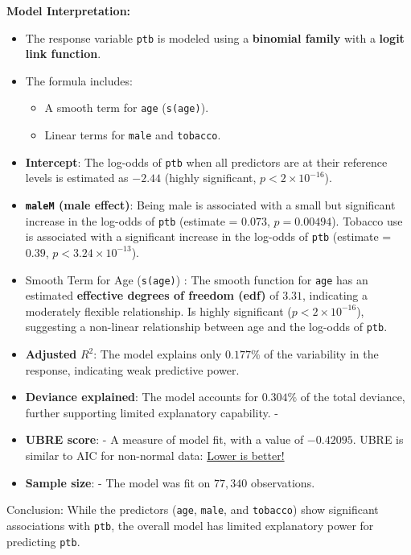 \documentclass[
  letterpaper,
  DIV=11,
  numbers=noendperiod]{scrreprt}
\providecommand{\tightlist}{%
  \setlength{\itemsep}{0pt}\setlength{\parskip}{0pt}}\usepackage{longtable,booktabs,array}
\begin{document}
\textbf{Model Interpretation:}

\begin{itemize}
\item
  The response variable \texttt{ptb} is modeled using a \textbf{binomial
  family} with a \textbf{logit link function}.
\item
  The formula includes:

  \begin{itemize}
  \tightlist
  \item
    A smooth term for \texttt{age} (\texttt{s(age)}).
  \item
    Linear terms for \texttt{male} and \texttt{tobacco}.
  \end{itemize}
\item
  \textbf{Intercept}: The log-odds of \texttt{ptb} when all predictors
  are at their reference levels is estimated as \(-2.44\) (highly
  significant, \(p < 2 \times 10^{-16}\)).
\item
  \textbf{\texttt{maleM} (male effect)}: Being male is associated with a
  small but significant increase in the log-odds of \texttt{ptb}
  (estimate = \(0.073\), \(p = 0.00494\)). Tobacco use is associated
  with a significant increase in the log-odds of \texttt{ptb} (estimate
  = \(0.39\), \(p < 3.24 \times 10^{-13}\)).
\item
  Smooth Term for Age (\texttt{s(age)}) : The smooth function for
  \texttt{age} has an estimated \textbf{effective degrees of freedom
  (edf)} of \(3.31\), indicating a moderately flexible relationship. Is
  highly significant (\(p < 2 \times 10^{-16}\)), suggesting a
  non-linear relationship between age and the log-odds of \texttt{ptb}.
\item
  \textbf{Adjusted} \(R^2\): The model explains only \(0.177\%\) of the
  variability in the response, indicating weak predictive power.
\item
  \textbf{Deviance explained}: The model accounts for \(0.304\%\) of the
  total deviance, further supporting limited explanatory capability. -
\item
  \textbf{UBRE score}: - A measure of model fit, with a value of
  \(-0.42095\). UBRE is similar to AIC for non-normal data: \ul{Lower is
  better!}
\item
  \textbf{Sample size}: - The model was fit on \(77,340\) observations.
\end{itemize}

Conclusion: While the predictors (\texttt{age}, \texttt{male}, and
\texttt{tobacco}) show significant associations with \texttt{ptb}, the
overall model has limited explanatory power for predicting \texttt{ptb}.
\end{document}
